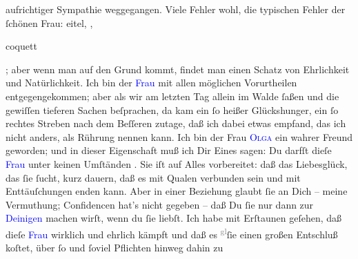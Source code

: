                aufrichtiger Sympathie weggegangen. Viele Fehler wohl, \strikeout{\textcolor{gray}{aber}} die typischen Fehler der ſchönen Frau: eitel, \label{K_L02648-1v}\label{K_L02648-1h},
                  \begin{otherlanguage}{french}coquett\end{otherlanguage}; aber wenn man auf den Grund kommt,
               findet man einen Schatz von Ehrlichkeit und Natürlichkeit. Ich bin der \textcolor{blue}{Frau}{} mit allen möglichen
               Vorurtheilen {\pb}entgegengekommen; aber
               als wir am letzten Tag allein im Walde ſaßen und die gewiſſen tieferen Sachen
               beſprachen, da kam ein ſo heißer Glückshunger, ein ſo rechtes Streben nach dem
               Beſſeren zutage, daß ich dabei etwas empfand, das ich nicht anders, als Rührung
               nennen kann. Ich bin der Frau \textsc{\textcolor{blue}{Olga}{}\ledrightnote{\textcolor{blue}{Olga Waissnix}}} ein wahrer Freund geworden; und in dieser Eigenschaft muß ich Dir Eines sagen:
               Du darfſt dieſe \textcolor{blue}{Frau}{} unter
               keinen Umſtänden \label{K_L02648-2v}\label{K_L02648-2h}. Sie iſt auf Alles vorbereitet: daß das Liebesglück, das
               ſie ſucht, kurz dauern, daß es mit Qualen verbunden sein und mit Enttäuſchungen enden
               kann. Aber in einer Beziehung glaubt ſie an Dich – meine Vermuthung; {\pb}Confidencen hat’s nicht gegeben –
               daß Du ſie nur dann zur \textcolor{blue}{Deinigen}{} machen wirſt, wenn du ſie liebſt. Ich habe mit Erſtaunen geſehen,
               daß dieſe \textcolor{blue}{Frau}{} wirklich und
               ehrlich kämpft und daß es \substVorne{}\textsuperscript{\textcolor{gray}{gl}}\substDazwischen{}ſie\substHinten{} einen großen Entschluß koſtet, über ſo und ſoviel Pflichten hinweg dahin zu
